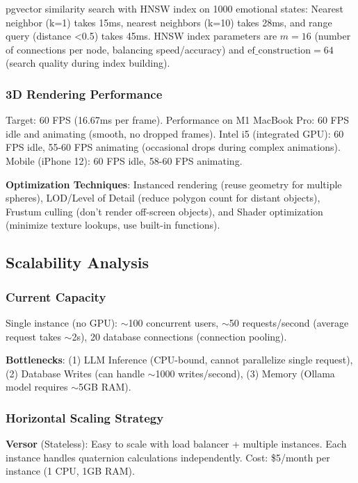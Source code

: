 \documentclass[10pt,twocolumn]{article}
\begin{document}
pgvector similarity search with HNSW index on 1000 emotional states: Nearest neighbor (k=1) takes 15ms, nearest neighbors (k=10) takes 28ms, and range query (distance <0.5) takes 45ms. HNSW index parameters are $m = 16$ (number of connections per node, balancing speed/accuracy) and $\text{ef\_construction} = 64$ (search quality during index building).

\subsubsection{3D Rendering Performance}

Target: 60 FPS (16.67ms per frame). Performance on M1 MacBook Pro: 60 FPS idle and animating (smooth, no dropped frames). Intel i5 (integrated GPU): 60 FPS idle, 55-60 FPS animating (occasional drops during complex animations). Mobile (iPhone 12): 60 FPS idle, 58-60 FPS animating.

\textbf{Optimization Techniques}: Instanced rendering (reuse geometry for multiple spheres), LOD/Level of Detail (reduce polygon count for distant objects), Frustum culling (don't render off-screen objects), and Shader optimization (minimize texture lookups, use built-in functions).

\subsection{Scalability Analysis}

\subsubsection{Current Capacity}

Single instance (no GPU): $\sim$100 concurrent users, $\sim$50 requests/second (average request takes $\sim$2s), 20 database connections (connection pooling).

\textbf{Bottlenecks}: (1) LLM Inference (CPU-bound, cannot parallelize single request), (2) Database Writes (can handle $\sim$1000 writes/second), (3) Memory (Ollama model requires $\sim$5GB RAM).

\subsubsection{Horizontal Scaling Strategy}

\textbf{Versor} (Stateless): Easy to scale with load balancer + multiple instances. Each instance handles quaternion calculations independently. Cost: \$5/month per instance (1 CPU, 1GB RAM).
\end{document}
